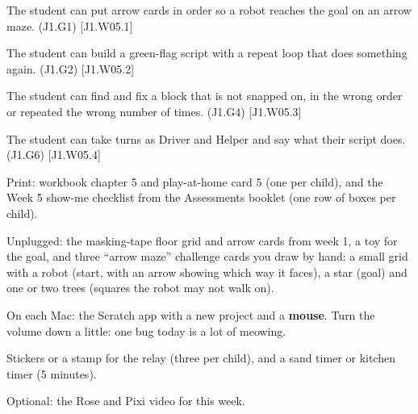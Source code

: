 
\begin{objectives}
  \item The student can put arrow cards in order so a robot reaches the goal on an arrow maze. (J1.G1) [J1.W05.1]
  \item The student can build a green-flag script with a repeat loop that does something again. (J1.G2) [J1.W05.2]
  \item The student can find and fix a block that is not snapped on, in the wrong order or repeated the wrong number of times. (J1.G4) [J1.W05.3]
  \item The student can take turns as Driver and Helper and say what their script does. (J1.G6) [J1.W05.4]
\end{objectives}

\begin{materials}
  \item Print: workbook chapter 5 and play-at-home card 5 (one per child), and the Week 5 show-me checklist from the Assessments booklet (one row of boxes per child).
  \item Unplugged: the masking-tape floor grid and arrow cards from week 1, a toy for the goal, and three \enquote{arrow maze} challenge cards you draw by hand: a small grid with a robot (start, with an arrow showing which way it faces), a star (goal) and one or two trees (squares the robot may not walk on).
  \item On each Mac: the Scratch app with a new project and a \textbf{mouse}. Turn the volume down a little: one bug today is a lot of meowing.
  \item Stickers or a stamp for the relay (three per child), and a sand timer or kitchen timer (5 minutes).
  \item Optional: the Rose and Pixi video for this week.
\end{materials}

